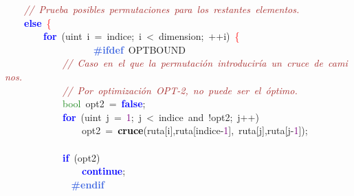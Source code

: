 \mbox{}\ \ \ \ \textit{\textcolor{Brown}{//\ Prueba\ posibles\ permutaciones\ para\ los\ restantes\ elementos.}} \\
\mbox{}\ \ \ \ \textbf{\textcolor{Blue}{else}}\ \textcolor{Red}{\{} \\
\mbox{}\ \ \ \ \ \ \ \ \textbf{\textcolor{Blue}{for}}\ \textcolor{BrickRed}{(}\textcolor{TealBlue}{uint}\ i\ \textcolor{BrickRed}{=}\ indice\textcolor{BrickRed}{;}\ i\ \textcolor{BrickRed}{\textless{}}\ dimension\textcolor{BrickRed}{;}\ \textcolor{BrickRed}{++}i\textcolor{BrickRed}{)}\ \textcolor{Red}{\{} \\
\mbox{}\textbf{\textcolor{RoyalBlue}{\ \ \ \ \ \ \ \ \ \ \ \ \ \ \ \ \#ifdef}}\ OPTBOUND \\
\mbox{}\ \ \ \ \ \ \ \ \ \ \ \ \textit{\textcolor{Brown}{//\ Caso\ en\ el\ que\ la\ permutación\ introduciría\ un\ cruce\ de\ caminos.}} \\
\mbox{}\ \ \ \ \ \ \ \ \ \ \ \ \textit{\textcolor{Brown}{//\ Por\ optimización\ OPT-2,\ no\ puede\ ser\ el\ óptimo.}} \\
\mbox{}\ \ \ \ \ \ \ \ \ \ \ \ \textcolor{ForestGreen}{bool}\ opt2\ \textcolor{BrickRed}{=}\ \textbf{\textcolor{Blue}{false}}\textcolor{BrickRed}{;} \\
\mbox{}\ \ \ \ \ \ \ \ \ \ \ \ \textbf{\textcolor{Blue}{for}}\ \textcolor{BrickRed}{(}\textcolor{TealBlue}{uint}\ j\ \textcolor{BrickRed}{=}\ \textcolor{Purple}{1}\textcolor{BrickRed}{;}\ j\ \textcolor{BrickRed}{\textless{}}\ \textcolor{TealBlue}{indice}\ and\ \textcolor{BrickRed}{!}opt2\textcolor{BrickRed}{;}\ j\textcolor{BrickRed}{++)} \\
\mbox{}\ \ \ \ \ \ \ \ \ \ \ \ \ \ \ \ opt2\ \textcolor{BrickRed}{=}\ \textbf{\textcolor{Black}{cruce}}\textcolor{BrickRed}{(}ruta\textcolor{BrickRed}{[}i\textcolor{BrickRed}{],}ruta\textcolor{BrickRed}{[}indice\textcolor{BrickRed}{-}\textcolor{Purple}{1}\textcolor{BrickRed}{],}\ ruta\textcolor{BrickRed}{[}j\textcolor{BrickRed}{],}ruta\textcolor{BrickRed}{[}j\textcolor{BrickRed}{-}\textcolor{Purple}{1}\textcolor{BrickRed}{]);} \\
\mbox{} \\
\mbox{}\ \ \ \ \ \ \ \ \ \ \ \ \textbf{\textcolor{Blue}{if}}\ \textcolor{BrickRed}{(}opt2\textcolor{BrickRed}{)} \\
\mbox{}\ \ \ \ \ \ \ \ \ \ \ \ \ \ \ \ \textbf{\textcolor{Blue}{continue}}\textcolor{BrickRed}{;} \\
\mbox{}\textbf{\textcolor{RoyalBlue}{\ \ \ \ \ \ \ \ \ \ \ \ \#endif}} \\
